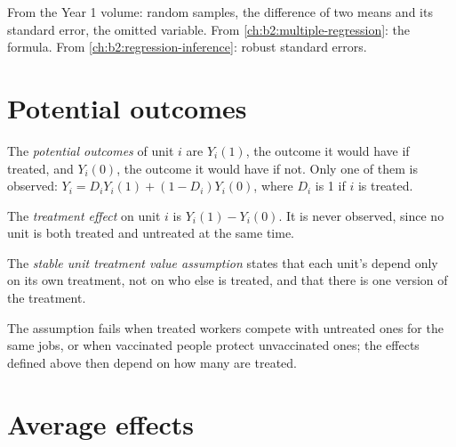 \begin{recall}
From the Year 1 volume: random samples, the difference of two means and its standard error, the omitted variable. From
\cref{ch:b2:multiple-regression}: the  formula. From \cref{ch:b2:regression-inference}: robust
standard errors.
\end{recall}

\section{Potential outcomes}\label{sec:b2:causality-and-experiments:potential}

\begin{definition}\label{def:b2:causality-and-experiments:potential-outcome}
The \emph{potential outcomes} of unit $i$ are $Y_i(1)$, the outcome it would have if treated,
and $Y_i(0)$, the outcome it would have if not. Only one of them is observed: $Y_i = D_iY_i(1) + (1 - D_i)Y_i(0)$, where
$D_i$ is 1 if $i$ is treated.
\end{definition}

\begin{definition}\label{def:b2:causality-and-experiments:treatment-effect}
The \emph{treatment effect} on unit $i$ is $Y_i(1) - Y_i(0)$. It is never observed, since no unit
is both treated and untreated at the same time.
\end{definition}

\begin{definition}\label{def:b2:causality-and-experiments:sutva}
The \emph{stable unit treatment value assumption} states that each unit's
 depend only on its own treatment, not on who else is treated, and that there is one version of the
treatment.
\end{definition}

The assumption fails when treated workers compete with untreated ones for the same jobs, or when vaccinated people protect
unvaccinated ones; the effects defined above then depend on how many are treated.

\section{Average effects}\label{sec:b2:causality-and-experiments:averages}

